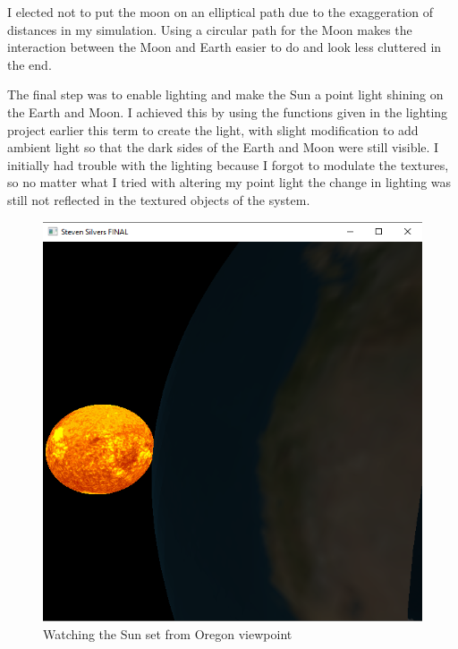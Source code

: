 \documentclass[12pt,serif,draftclsnofoot,onecolumn]{IEEEtran}
\begin{document}
			I elected not to put the moon on an elliptical path due to the exaggeration of distances in my simulation. Using a circular path for the Moon makes the interaction between the Moon and Earth easier to do and look less cluttered in the end.
	\newline
	\par
			The final step was to enable lighting and make the Sun a point light shining on the Earth and Moon. I achieved this by using the functions given in the lighting project earlier this term to create the light, with slight modification to add ambient light so that the dark sides of the Earth and Moon were still visible. I initially had trouble with the lighting because I forgot to modulate the textures, so no matter what I tried with altering my point light the change in lighting was still not reflected in the textured objects of the system.
	
	
	\begin{figure}[h]
		\includegraphics[scale=.67]{cap2}
		\caption{Watching the Sun set from Oregon viewpoint}
	\end{figure}
\end{document}
